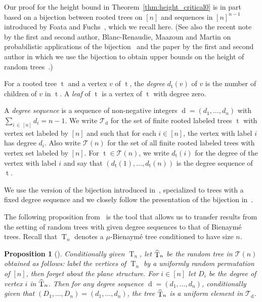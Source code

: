 \documentclass[10pt]{amsart}
\newtheorem{prop}[theo]{Proposition}
\theoremstyle{definition}
\numberwithin{figure}{section}
\DeclareMathOperator{\tree}{t}
\DeclareMathOperator{\rtree}{T}
\DeclareMathOperator{\dseq}{d}
\newcommand\cT{\mathcal{T}}
\let\oldhat\hat
\renewcommand*{\hat}[1]{\mathchoice{\widehat{#1}}{\widehat{#1}}{\oldhat{#1}}{\oldhat{#1}}}
\begin{document}
Our {proof for the height bound in Theorem~\ref{thm:height_critical0}} is in part based on a bijection between rooted trees on $[n]$ and sequences in $[n]^{n-1}$ introduced by Foata and Fuchs~\cite{FoataFuchs}, which we recall here. (See also the recent note by the first and second author, Blanc-Renaudie, Maazoun and Martin on probabilistic applications of the bijection~\cite{cayley_us} and the paper by the first and second author in which we use the bijection to obtain upper bounds on the height of random trees~\cite{AD22}.)

For a rooted tree $\tree$ and a vertex $v$ of $\tree$, the \emph{degree} $d_{\tree}(v)$ of $v$ is the number of children of $v$ in $\tree$. A \emph{leaf} of $\tree$ is a vertex of $\tree$ with degree zero.

A \emph{degree sequence} is a sequence of non-negative integers $\dseq=(d_1,\ldots,d_n)$ with $\sum_{i\,\in \,[n]} d_i = n-1$. We write $\cT_{\dseq}$ for the set of finite rooted labeled trees $\tree$ with vertex set labeled by $[n]$ and such that for each $i \in [n]$, the vertex with label $i$ has degree $d_i$. Also write $\cT(n)$ for the set of all finite rooted labeled trees with vertex set labeled by $[n]$. For $\tree \in \cT(n)$, we write $d_{\tree}(i)$ for the degree of the vertex with label $i$ and say that $(d_{\tree}(1),\ldots,d_{\tree}(n))$ is the degree sequence of $\tree$.

We use the version of the bijection introduced in~\cite[Section~3]{cayley_us}, specialized to trees with a fixed degree sequence and we closely follow the presentation of the bijection in~\cite{AD22}.


The following proposition from~\cite{AD22} is the tool that allows us to transfer results from the setting of random trees with given degree sequences to that of Bienaymé trees. Recall that $\rtree_n$ denotes a $\mu$-Bienaymé tree conditioned to have size $n$.

\begin{prop}[{\cite[Proposition~8]{AD22}}]\label{prop:planetrees}
Conditionally given $\rtree_{n}$, let $\hat{\rtree}_{n}$ be the random tree in $\cT(n)$ obtained as follows: label the vertices of $\rtree_{n}$ by a uniformly random permutation of $[n]$, then forget about the plane structure. For $i \in [n]$ let $D_i$ be the degree of vertex $i$ in $\hat{\rtree}_{n}$. Then for any degree sequence $\dseq=(d_1,\ldots,d_n)$, conditionally given that $(D_1,\ldots,D_n)=(d_1,\ldots,d_n)$, the tree $\hat{\rtree}_{n}$ is a uniform element in $\cT_{\dseq}$.
\end{prop}
\end{document}
